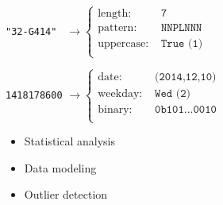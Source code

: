 \begin{block}{}
  
  \texttt{"32-G414"~} $\longrightarrow
  \begin{cases}
    \text{length: } & \texttt{7}\\
    \text{pattern: } & \texttt{NNPLNNN}\\
    \text{uppercase: } & \texttt{True (1)}\\
  \end{cases}$
  
  \texttt{1418178600} $\longrightarrow
  \begin{cases}
    \text{date: } & \texttt{(2014,12,10)}\\
    \text{weekday: } & \texttt{Wed (2)}\\
    \text{binary: } & \texttt{0b101...0010}\\
  \end{cases}$
  
  \begin{itemize}
  \item Statistical analysis
  \item Data modeling
  \item Outlier detection
  \end{itemize}
\end{block}